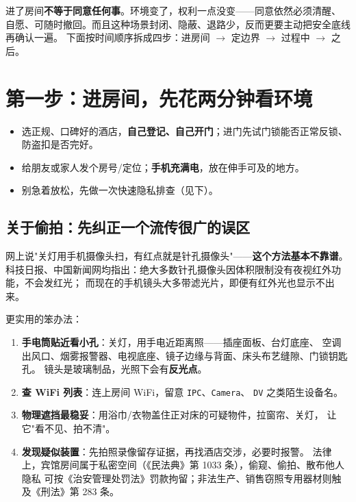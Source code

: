 \documentclass[12pt,UTF8,openany]{ctexbook}
\begin{document}
进了房间\textbf{不等于同意任何事}。环境变了，权利一点没变——同意依然必须清醒、
自愿、可随时撤回。而且这种场景封闭、隐蔽、退路少，反而更要主动把安全底线再确认一遍。
下面按时间顺序拆成四步：进房间 $\to$ 定边界 $\to$ 过程中 $\to$ 之后。

\section{第一步：进房间，先花两分钟看环境}

\begin{itemize}[leftmargin=2em]
  \item 选正规、口碑好的酒店，\textbf{自己登记、自己开门}；进门先试门锁能否正常反锁、
        防盗扣是否完好。
  \item 给朋友或家人发个房号/定位；\textbf{手机充满电}，放在伸手可及的地方。
  \item 别急着放松，先做一次快速隐私排查（见下）。
\end{itemize}

\subsection*{关于偷拍：先纠正一个流传很广的误区}

网上说"关灯用手机摄像头扫，有红点就是针孔摄像头"——\textbf{这个方法基本不靠谱}。
科技日报、中国新闻网均指出：绝大多数针孔摄像头因体积限制没有夜视红外功能，不会发红光；
而现在的手机镜头大多带滤光片，即便有红外光也显示不出来。

更实用的笨办法：

\begin{enumerate}[leftmargin=2em,itemsep=0.3em]
  \item \textbf{手电筒贴近看小孔}：关灯，用手电近距离照——插座面板、台灯底座、
        空调出风口、烟雾报警器、电视底座、镜子边缘与背面、床头布艺缝隙、门锁钥匙孔。
        镜头是玻璃制品，光照下会有\textbf{反光点}。
  \item \textbf{查 WiFi 列表}：连上房间 WiFi，留意 \texttt{IPC}、\texttt{Camera}、
        \texttt{DV} 之类陌生设备名。
  \item \textbf{物理遮挡最稳妥}：用浴巾/衣物盖住正对床的可疑物件，拉窗帘、关灯，
        让它"看不见、拍不清"。
  \item \textbf{发现疑似装置}：先拍照录像留存证据，再找酒店交涉，必要时报警。
        法律上，宾馆房间属于私密空间（《民法典》第 1033 条），偷窥、偷拍、散布他人隐私
        可按《治安管理处罚法》罚款拘留；非法生产、销售窃照专用器材则触及《刑法》第 283 条。
\end{enumerate}
\end{document}
